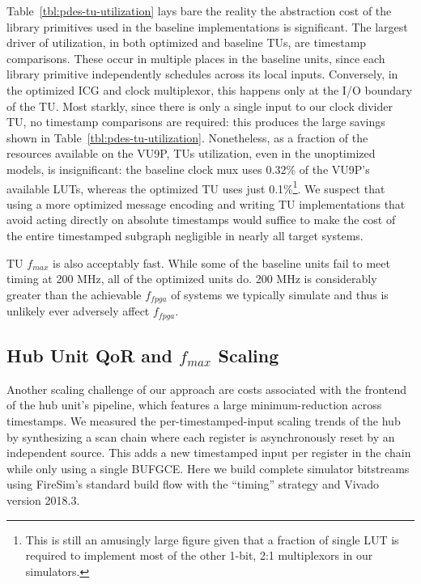 Table~\ref{tbl:pdes-tu-utilization} lays bare the reality the abstraction cost of the
library primitives used in the baseline implementations is significant. The largest
driver of utilization, in both optimized and baseline TUs, are timestamp comparisons. These occur in multiple places in the
baseline units, since each library primitive independently schedules across its
local inputs. Conversely, in the optimized ICG and clock multiplexor, this happens only
at the I/O boundary of the TU. Most starkly, since there is only a single input
to our clock divider TU, no timestamp comparisons are required: this produces
the large savings shown in Table~\ref{tbl:pdes-tu-utilization}. Nonetheless, as a fraction of the resources
available on the VU9P, TUs utilization, even in the unoptimized models, is
insignificant: the baseline clock mux uses 0.32\% of the VU9P's available LUTs,
whereas the optimized TU uses just 0.1\%\footnote{This is still an amusingly
large figure given that a fraction of single LUT is required to implement most of the
other 1-bit, 2:1 multiplexors in our simulators.}.
We suspect that using a more optimized message encoding and writing TU implementations that
avoid acting directly on absolute timestamps would suffice to make the cost of
the entire timestamped subgraph negligible in nearly all target systems.

TU $f_{max}$ is also acceptably fast. While some of the baseline units fail to
meet timing at 200 MHz, all of the optimized units do. 200 MHz is considerably
greater than the achievable $f_{fpga}$ of systems we typically simulate and
thus is unlikely ever adversely affect $f_{fpga}$.

\subsection{Hub Unit QoR and $f_{max}$ Scaling}
Another scaling challenge of our approach are costs associated with the
frontend of the hub unit's pipeline, which features a large minimum-reduction
across timestamps. We measured the per-timestamped-input scaling trends of the
hub by synthesizing a scan chain where each register is asynchronously reset
by an independent source. This adds a new timestamped input per register in the
chain while only using a single BUFGCE. Here we build complete
simulator bitstreams using FireSim's standard build flow with the ``timing''
strategy and Vivado version 2018.3.

